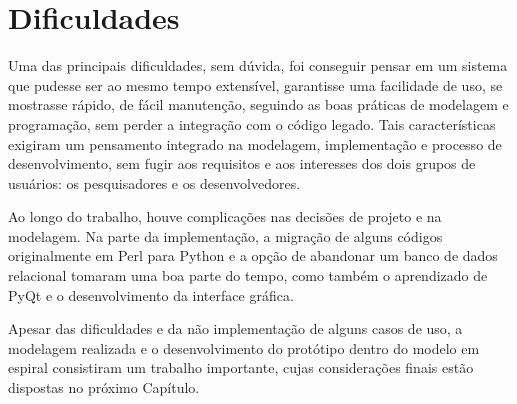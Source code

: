 \section{Dificuldades} \label{sec:dificuldades}

Uma das principais dificuldades, sem dúvida, foi conseguir pensar em um sistema que pudesse ser ao mesmo tempo extensível, garantisse uma facilidade de uso,
se mostrasse rápido, de fácil manutenção, seguindo as boas práticas de modelagem e programação, sem perder a integração com o código legado. Tais
características exigiram um pensamento integrado na modelagem, implementação e processo de desenvolvimento, sem fugir aos requisitos e aos interesses dos dois
grupos de usuários: os pesquisadores e os desenvolvedores.

Ao longo do trabalho, houve complicações nas decisões de projeto e na modelagem. Na parte da implementação, a migração de alguns códigos originalmente em Perl
para Python e a opção de abandonar um banco de dados relacional tomaram uma boa parte do tempo, como também o aprendizado de PyQt e o desenvolvimento da
interface gráfica.

Apesar das dificuldades e da não implementação de alguns casos de uso, a modelagem realizada e o desenvolvimento do protótipo dentro do modelo em espiral
consistiram um trabalho importante, cujas considerações finais estão dispostas no próximo Capítulo.